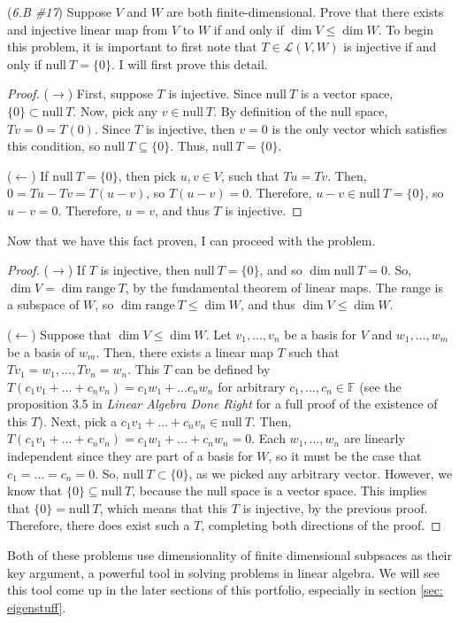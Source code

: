 \documentclass{article}
\renewcommand{\L}{\mathcal{L}}
\newcommand{\nulls}{\mathrm{null}}
\newcommand{\range}{\mathrm{range}\ }
\newcommand{\F}{\mathbb{F}}
\theoremstyle{definition}
\begin{document}
\begin{problem}{(\textit{6.B \#17}) Suppose $V$ and $W$ are both finite-dimensional. Prove that there exists and injective linear map from $V$ to $W$ if and only if $\dim V \leq \dim W$.}
    To begin this problem, it is important to first note that $T \in \L(V, W)$ is injective if and only if $\nulls\ T = \{0\}$. I will first prove this detail.
    \begin{proof}
        ($\rightarrow$) First, suppose $T$ is injective. Since $\nulls\ T$ is a vector space, $\{0\} \subset \nulls\ T$. Now, pick any $v \in \nulls\ T$. By definition of the null space, $Tv = 0 = T(0)$. Since $T$ is injective, then $v = 0$ is the only vector which satisfies this condition, so $\nulls\ T \subseteq \{0\}$. Thus, $\nulls\ T = \{0\}$.

        ($\leftarrow$) If $\nulls\ T = \{0\}$, then pick $u, v \in V$, such that $Tu = Tv$. Then, $0 = Tu - Tv = T(u - v)$, so $T(u - v) = 0$. Therefore, $u - v \in \nulls\ T = \{0\}$, so $u - v = 0$. Therefore, $u = v$, and thus $T$ is injective.
    \end{proof}
    Now that we have this fact proven, I can proceed with the problem.
    \begin{proof}
        ($\rightarrow$) If $T$ is injective, then $\nulls\ T = \{0\}$, and so $\dim \nulls\ T = 0$. So, $\dim V = \dim \range T$, by the fundamental theorem of linear maps. The range is a subspace of $W$, so $\dim \range T \leq \dim W$, and thus $\dim V \leq \dim W$.
        
        ($\leftarrow$) Suppose that $\dim V \leq \dim W$. Let $v_1, \dots, v_n$ be a basis for $V$ and $w_1, \dots, w_m$ be a basis of $w_m$. Then, there exists a linear map $T$ such that $Tv_1 = w_1, \dots, Tv_n = w_n$. This $T$ can be defined by $T(c_1v_1 + \dots + c_nv_n) = c_1w_1 + \dots c_nw_n$ for arbitrary $c_1, \dots, c_n \in \F$ (see the proposition 3.5 in \textit{Linear Algebra Done Right} for a full proof of the existence of this $T$). Next, pick a $c_1v_1 + \dots + c_nv_n \in \nulls\ T$. Then, $T(c_1v_1 + \dots + c_nv_n) = c_1w_1 + \dots + c_nw_n = 0$. Each $w_1, \dots, w_n$ are linearly independent since they are part of a basis for $W$, so it must be the case that $c_1 = \dots = c_n = 0$. So, $\nulls\ T \subset \{0\}$, as we picked any arbitrary vector. However, we know that $\{0\} \subseteq \nulls\ T$, because the null space is a vector space. This implies that $\{0\} = \nulls\ T$, which means that this $T$ is injective, by the previous proof. Therefore, there does exist such a $T$, completing both directions of the proof.
    \end{proof}
\end{problem}
Both of these problems use dimensionality of finite dimensional subpsaces as their key argument, a powerful tool in solving problems in linear algebra. We will see this tool come up in the later sections of this portfolio, especially in section \ref{sec: eigenstuff}.
\end{document}
